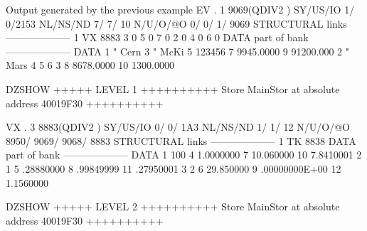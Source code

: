 \begin{Listing}{Output generated by the previous example}
 EV  .     1     9069(QDIV2   ) SY/US/IO    1/    0/2153 NL/NS/ND    7/    7/      10 N/U/O/@O       0/       0/       1/    9069
STRUCTURAL links                                          --------------------                                                   
          1    VX        8883     3                 0     5                 0     7                 0                            
          2                 0     4                 0     6                 0                                                    
DATA part of bank                                         --------------------                                                   
DATA      1     "        Cern     3     "        McKi     5            123456     7     9945.0000         9     91200.000        
          2     "        Mars     4                 5     6                 3     8     8678.0000        10     1300.0000        
                                                                                                                                 
DZSHOW  +++++ LEVEL     1 ++++++++++            Store  MainStor at absolute address 40019F30      ++++++++++                     
                                                                                                                                 
 VX  .     3     8883(QDIV2   ) SY/US/IO    0/    0/ 1A3 NL/NS/ND    1/    1/      12 N/U/O/@O    8950/    9069/    9068/    8883
STRUCTURAL links                                          --------------------                                                   
          1    TK        8838                                                                                                    
DATA part of bank                                         --------------------                                                   
DATA      1               100     4     1.0000000         7     10.060000        10     7.8410001                                
          2                 1     5     .28880000         8     .99849999        11     .27950001                                
          3                 2     6     29.850000         9     .00000000E+00    12     1.1560000                                
                                                                                                                                 
DZSHOW  +++++ LEVEL     2 ++++++++++            Store  MainStor at absolute address 40019F30      ++++++++++                     
                                                                                                                                 

\end{Listing}
